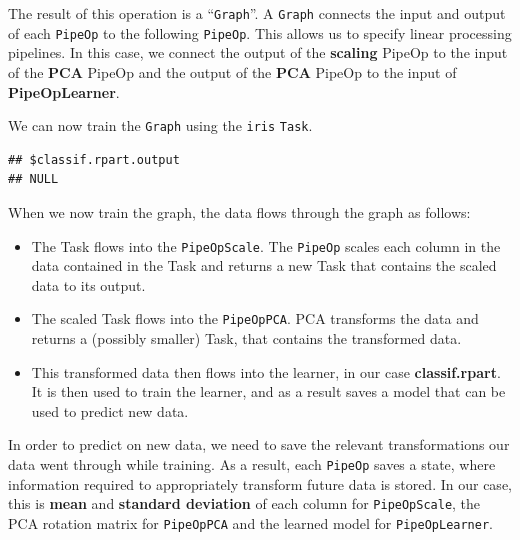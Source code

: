 \documentclass[]{article}
\newenvironment{Shaded}{\begin{snugshade}}{\end{snugshade}}
\newcommand{\KeywordTok}[1]{\textcolor[rgb]{0.13,0.29,0.53}{\textbf{#1}}}
\newcommand{\NormalTok}[1]{#1}
\newcommand{\OperatorTok}[1]{\textcolor[rgb]{0.81,0.36,0.00}{\textbf{#1}}}
\newcommand{\StringTok}[1]{\textcolor[rgb]{0.31,0.60,0.02}{#1}}
\providecommand{\tightlist}{%
  \setlength{\itemsep}{0pt}\setlength{\parskip}{0pt}}
\renewenvironment{Shaded} {\begin{snugshade}\small} {\end{snugshade}}
\begin{document}
\begin{Shaded}
\end{Shaded}

The result of this operation is a ``\texttt{Graph}''.
A \texttt{Graph} connects the input and output of each \texttt{PipeOp} to the following \texttt{PipeOp}.
This allows us to specify linear processing pipelines.
In this case, we connect the output of the \textbf{scaling} PipeOp to the input of the \textbf{PCA} PipeOp and the output of the \textbf{PCA} PipeOp to the input of \textbf{PipeOpLearner}.

We can now train the \texttt{Graph} using the \texttt{iris} \texttt{Task}.

\begin{Shaded}
\end{Shaded}

\begin{verbatim}
## $classif.rpart.output
## NULL
\end{verbatim}

When we now train the graph, the data flows through the graph as follows:

\begin{itemize}
\tightlist
\item
  The Task flows into the \texttt{PipeOpScale}.
  The \texttt{PipeOp} scales each column in the data contained in the Task and returns a new Task that contains the scaled data to its output.
\item
  The scaled Task flows into the \texttt{PipeOpPCA}.
  PCA transforms the data and returns a (possibly smaller) Task, that contains the transformed data.
\item
  This transformed data then flows into the learner, in our case \textbf{classif.rpart}.
  It is then used to train the learner, and as a result saves a model that can be used to predict new data.
\end{itemize}

In order to predict on new data, we need to save the relevant transformations our data went through while training.
As a result, each \texttt{PipeOp} saves a state, where information required to appropriately transform future data is stored.
In our case, this is \textbf{mean} and \textbf{standard deviation} of each column for \texttt{PipeOpScale}, the PCA rotation matrix for \texttt{PipeOpPCA} and the learned model for \texttt{PipeOpLearner}.
\end{document}
